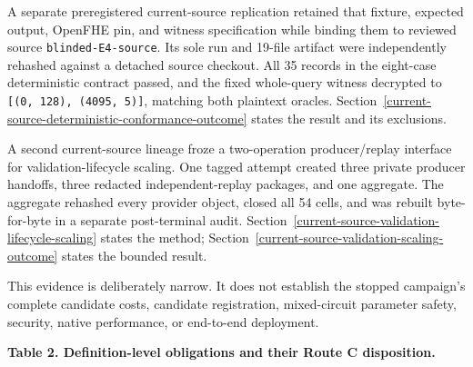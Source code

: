 A separate preregistered current-source replication retained that fixture,
expected output, OpenFHE pin, and witness specification while binding them to
reviewed source \texttt{blinded-E4-source}. Its sole run and 19-file artifact
were independently rehashed against a detached source checkout. All 35 records
in the eight-case deterministic contract passed, and the fixed whole-query
witness decrypted to \texttt{[(0, 128), (4095, 5)]}, matching both plaintext
oracles. Section~\ref{current-source-deterministic-conformance-outcome} states
the result and its exclusions.

A second current-source lineage froze a two-operation producer/replay interface
for validation-lifecycle scaling. One tagged attempt created three private producer
handoffs, three redacted independent-replay packages, and one aggregate. The
aggregate rehashed every provider object, closed all 54 cells, and was rebuilt
byte-for-byte in a separate post-terminal audit. Section~\ref{current-source-validation-lifecycle-scaling}
states the method; Section~\ref{current-source-validation-scaling-outcome}
states the bounded result.

This evidence is deliberately narrow. It does not establish the stopped
campaign's complete candidate costs, candidate registration, mixed-circuit
parameter safety, security, native performance, or end-to-end deployment.

\textbf{Table 2. Definition-level obligations and their Route C disposition.}

